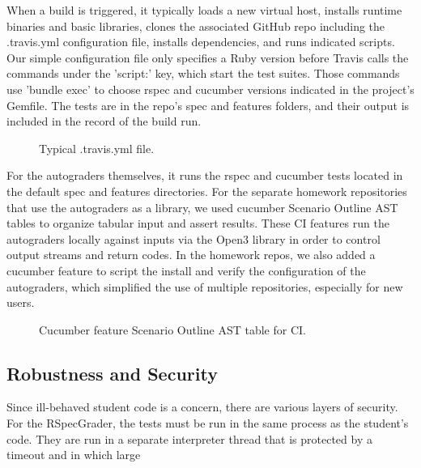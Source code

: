 When a build is triggered, it typically loads a new virtual host, installs runtime binaries and basic libraries, clones the associated GitHub repo including the .travis.yml configuration file, installs dependencies, and runs indicated scripts. Our simple configuration file only specifies a Ruby version before Travis calls the commands under the 'script:' key, which start the test suites. Those commands use 'bundle exec' to choose rspec and cucumber versions indicated in the project's Gemfile. The tests are in the repo's spec and features folders, and their output is included in the record of the build run.

\begin{figure}[!htbp]
  \centering
  \begin{minipage}{0.70\textwidth}%
  \lstset{tabsize=1,basicstyle=\scriptsize\ttfamily}%
  \end{minipage}
  \caption{\label{fig:rag-ci}%
  Typical .travis.yml file.
}
\end{figure}

For the autograders themselves, it runs the rspec and cucumber tests located in the default spec and features directories. For the separate homework repositories that use the autograders as a library, we used cucumber Scenario Outline AST tables to organize tabular input and assert results. These CI features run the autograders locally against inputs via the Open3 library in order to control output streams and return codes. In the homework repos, we also added a cucumber feature to script the install and verify the configuration of the autograders, which simplified the use of multiple repositories, especially for new users.

\begin{figure}[!htbp]
  \centering
  \begin{minipage}{0.99\textwidth}%
  \lstset{tabsize=1,basicstyle=\scriptsize\ttfamily}%
  \end{minipage}
  \caption{\label{fig:rag-ci}%
  Cucumber feature Scenario Outline AST table for CI.
}
\end{figure}


\subsection{Robustness and Security}

Since ill-behaved student code is a concern, there are various layers of
security.  For the RSpecGrader, the tests must be run in the same
process as the student's code.  They are run in a separate interpreter
thread that is protected by a timeout and in which large 

